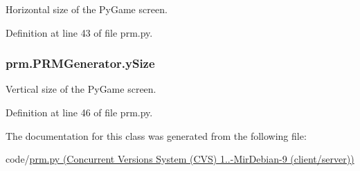 Horizontal size of the Py\-Game screen. 



Definition at line 43 of file prm.\-py.

\hypertarget{classprm_1_1PRMGenerator_aaa5cf5ecddd099bf8c294cad0b33be92}{
\subsubsection[{y\-Size}]{\setlength{\rightskip}{0pt plus 5cm}prm.\-P\-R\-M\-Generator.\-y\-Size}}\label{classprm_1_1PRMGenerator_aaa5cf5ecddd099bf8c294cad0b33be92}


Vertical size of the Py\-Game screen. 



Definition at line 46 of file prm.\-py.



The documentation for this class was generated from the following file\-:\begin{DoxyCompactItemize}
\item 
code/\hyperlink{prm_8py}{prm.\-py (\-Concurrent Versions System (\-C\-V\-S) 1..-\/\-Mir\-Debian-\/9 (client/server))}\end{DoxyCompactItemize}
